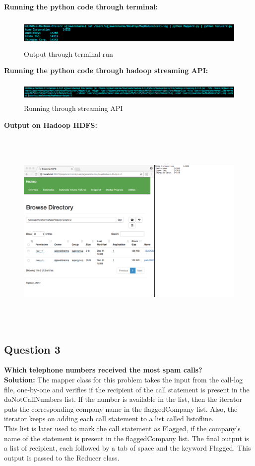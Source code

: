 \documentclass[a4paper, 10pt]{article}
\begin{document}
\noindent
\textbf{Running the python code through terminal:}
\begin{figure}[!htbp]
    \centering
    \includegraphics[height=1.5cm]{Question2.png}
    \caption{Output through terminal run}
\end{figure}

\noindent
\textbf{Running the python code through hadoop streaming API:}
\begin{figure}[!htbp]
    \centering
    \includegraphics[height=1cm]{Run2.png}
    \caption{Running through streaming API}
\end{figure}

\noindent
\textbf{Output on Hadoop HDFS:}
\begin{figure}[!htbp]
    \centering
    \includegraphics[height=10cm]{Hadoop2.png}
\end{figure}

\subsection{Question 3}
\textbf{Which telephone numbers received the most spam calls?}\\
\noindent
\textbf{Solution:}
The mapper class for this problem takes the input from the call-log file, one-by-one and verifies if the recipient of the call statement is present in the doNotCallNumbers list. If the number is available in the list, then the iterator puts the corresponding company name in the flaggedCompany list. Also, the iterator keeps on adding each call statement to a list called listofline.\\
\newpage
This list is later used to mark the call statement as Flagged, if the company's name of the statement is present in the flaggedCompany list. The final output is a list of recipient, each followed by a tab of space and the keyword Flagged. This output is passed to the Reducer class.
\end{document}
